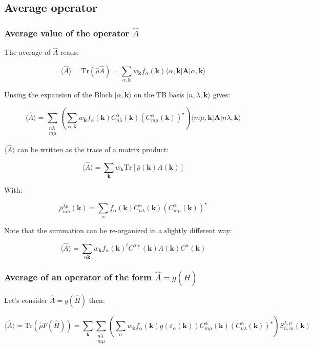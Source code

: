 \documentclass{article}
\newcommand{\bra}[1]{\langle #1|}
\newcommand{\ket}[1]{|#1\rangle}
\newcommand{\op}[1]{\hat{#1}}
\begin{document}
\subsection{Average operator}


\subsubsection{Average value of the operator $\op{A}$}


\noindent The average of $\op{ A}$ reads:

\[ \langle \op{A} \rangle =\mbox{Tr} (\op{\rho} \op{A})=\sum_{\alpha,\mathbf{k}}
w_{\mathbf{k}}f_{\alpha}(\mathbf{k}) \bra{\alpha,\mathbf{k}}\bm{A}\ket{\alpha,\mathbf{k}} \]

\noindent
Unsing the expansion of the Bloch $\ket{\alpha,\mathbf{k}}$ on the TB basis $\ket{n,\lambda,\mathbf{k}}$ gives:


\[ \displaystyle  \langle \op{A}\rangle=  \sum_{\substack{n \lambda \\ m \mu}} 
\left( \sum_{\alpha,\mathbf{k}} w_{\mathbf{k}} f_{\alpha}(\mathbf{k}) 
C_{n \lambda}^{\alpha}(\mathbf{k})(C_{m \mu}^{\alpha}(\mathbf{k}))^{\star} \right)   
\bra{ m \mu,\mathbf{k}}{\bm A} \ket{n \lambda,\mathbf{k}} \]


\noindent
$\langle \op{A} \rangle$ can be written as the trace of a matrix product:

\[ \langle \op{A} \rangle=\sum_{\mathbf{k}} w_{\mathbf{k}} \text{Tr} \left[\bar{\rho}(\mathbf{k}) A(\mathbf{k}) \right] \]

\noindent
With:

\[ \bar{\rho}_{nm}^{\lambda \mu}(\mathbf{k})=  \sum_{\alpha}  f_{\alpha}(\mathbf{k})
C_{n \lambda}^{\alpha}(\mathbf{k})(C_{m \mu}^{\alpha}(\mathbf{k}))^{\star}    \]

\noindent
Note that the summation can be re-organized in a slightly different way:

\[\langle \op{A} \rangle =\sum_{\alpha \mathbf{k}} w_{\mathbf{k}} f_{\alpha}(\mathbf{k})
^tC^{\alpha \star}(\mathbf{k}) A(\mathbf{k}) C^{\alpha}(\mathbf{k}) \]


\subsubsection{Average of an operator of the form $\op{A}=g(\op{H})$}

\noindent
Let's consider $\op{A}=g(\op{H})$ then:


\[ \langle \op{A} \rangle =\mbox{Tr} (\op{\rho} F(\op{H}))= \sum_{\mathbf{k}}
\sum_{\substack{n \lambda\\ m \mu}}\left(
\sum_{\alpha} w_{\mathbf{k}}f_{\alpha}(\mathbf{k})g(\varepsilon_{\alpha}(\mathbf{k}))
 C_{m\mu}^{\alpha}(\mathbf{k}) (C_{n \lambda}^{\alpha}(\mathbf{k}))^{\star} \right)  S_{n,m}^{\lambda,\mu}(\mathbf{k})\]
\end{document}
